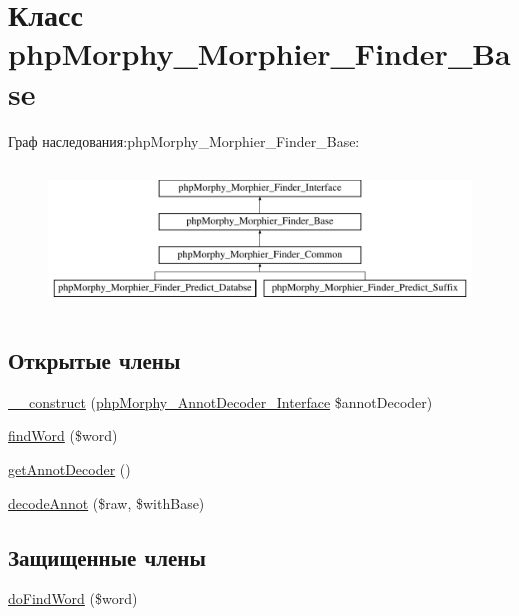 \hypertarget{classphpMorphy__Morphier__Finder__Base}{
\section{Класс phpMorphy\_\-Morphier\_\-Finder\_\-Base}
\label{classphpMorphy__Morphier__Finder__Base}
}
Граф наследования:phpMorphy\_\-Morphier\_\-Finder\_\-Base:\begin{figure}[H]
\begin{center}
\leavevmode
\includegraphics[height=3.888889cm]{classphpMorphy__Morphier__Finder__Base}
\end{center}
\end{figure}
\subsection*{Открытые члены}
\begin{DoxyCompactItemize}
\item 
\hyperlink{classphpMorphy__Morphier__Finder__Base_a8065a8d977be50331d3d9274ca9526fe}{\_\-\_\-construct} (\hyperlink{interfacephpMorphy__AnnotDecoder__Interface}{phpMorphy\_\-AnnotDecoder\_\-Interface} \$annotDecoder)
\item 
\hyperlink{classphpMorphy__Morphier__Finder__Base_a5cef0cc024404368dd456befa0f98d00}{findWord} (\$word)
\item 
\hyperlink{classphpMorphy__Morphier__Finder__Base_a57e2fb1bdbeafd21ed2ffc922a64748e}{getAnnotDecoder} ()
\item 
\hyperlink{classphpMorphy__Morphier__Finder__Base_a03c4ac63e28069b9c901272e7fe56aea}{decodeAnnot} (\$raw, \$withBase)
\end{DoxyCompactItemize}
\subsection*{Защищенные члены}
\begin{DoxyCompactItemize}
\item 
\hyperlink{classphpMorphy__Morphier__Finder__Base_aed9736efa1a4e7ad5bbad9c8b6c18685}{doFindWord} (\$word)
\end{DoxyCompactItemize}
